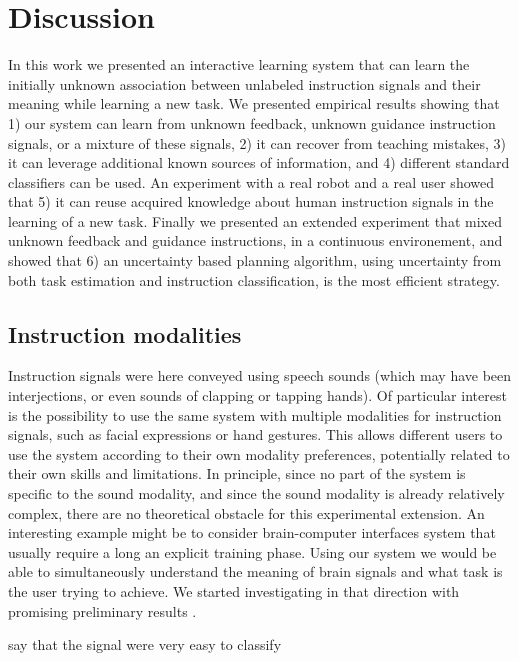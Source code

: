 \section{Discussion}

In this work we presented an interactive learning system that can learn the initially unknown association between unlabeled instruction signals and their meaning while learning a new task. We presented empirical results showing that 1) our system can learn from unknown feedback, unknown guidance instruction signals, or a mixture of these signals, 2) it can recover from teaching mistakes, 3) it can leverage additional known sources of information, and 4) different standard classifiers can be used. An experiment with a real robot and a real user showed that 5) it can reuse acquired knowledge about human instruction signals in the learning of a new task. Finally we presented an extended experiment that mixed unknown feedback and guidance instructions, in a continuous environement, and showed that 6) an uncertainty based planning algorithm, using uncertainty from both task estimation and instruction classification, is the most efficient strategy.

\subsection{Instruction modalities} Instruction signals were here conveyed using speech sounds (which may have been interjections, or even sounds of clapping or tapping hands). Of particular interest is the possibility to use the same system with multiple modalities for instruction signals, such as facial expressions or hand gestures. This allows different users to use the system according to their own modality preferences, potentially related to their own skills and limitations. In principle, since no part of the system is specific to the sound modality, and since the sound modality is already relatively complex, there are no theoretical obstacle for this experimental extension. An interesting example might be to consider brain-computer interfaces system \cite{chavarriaga2010learning, iturrate2010robot} that usually require a long an explicit training phase. Using our system we would be able to simultaneously understand the meaning of brain signals and what task is the user trying to achieve. We started investigating in that direction with promising preliminary results \cite{grizou2013zero}.



say that the signal were very easy to classify
